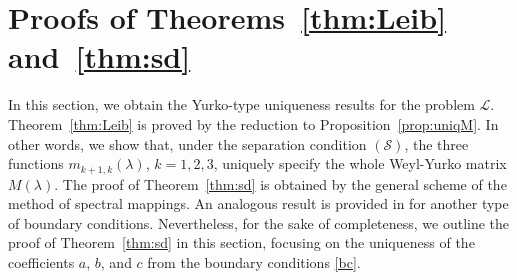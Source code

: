 \documentclass[a4paper,12pt]{article}
\newcommand{\la}{\lambda}
\theoremstyle{plain}
\numberwithin{equation}{section}
\theoremstyle{definition}
\theoremstyle{remark}
\begin{document}
\section{Proofs of Theorems~\ref{thm:Leib} and~\ref{thm:sd}} \label{sec:gen}

In this section, we obtain the Yurko-type uniqueness results for the problem $\mathcal L$. Theorem~\ref{thm:Leib} is proved by the reduction to Proposition~\ref{prop:uniqM}. In other words, we show that, under the separation condition $(\mathcal S)$, the three functions $m_{k+1,k}(\la)$, $k = 1, 2, 3$, uniquely specify the whole Weyl-Yurko matrix $M(\la)$. The proof of Theorem~\ref{thm:sd} is obtained by the general scheme of the method of spectral mappings. An analogous result is provided in \cite{Bond23-reg} for another type of boundary conditions. Nevertheless, for the sake of completeness, we outline the proof of Theorem~\ref{thm:sd} in this section, focusing on the uniqueness of the coefficients $a$, $b$, and $c$ from the boundary conditions \eqref{bc}.
\end{document}
